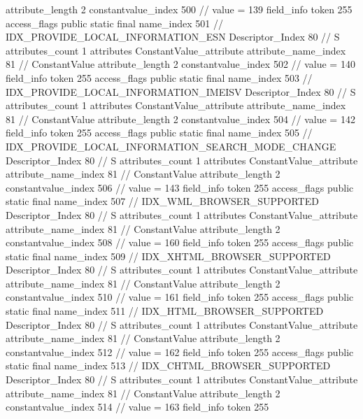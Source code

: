 {{{{{{{					attribute_length	2
					constantvalue_index	500		// value = 139
				}
				}
			}
			field_info {
				token	255
				access_flags	public static final
				name_index	501		// IDX_PROVIDE_LOCAL_INFORMATION_ESN
				Descriptor_Index	80		// S
				attributes_count	1
				attributes {
				ConstantValue_attribute {
					attribute_name_index	81		// ConstantValue
					attribute_length	2
					constantvalue_index	502		// value = 140
				}
				}
			}
			field_info {
				token	255
				access_flags	public static final
				name_index	503		// IDX_PROVIDE_LOCAL_INFORMATION_IMEISV
				Descriptor_Index	80		// S
				attributes_count	1
				attributes {
				ConstantValue_attribute {
					attribute_name_index	81		// ConstantValue
					attribute_length	2
					constantvalue_index	504		// value = 142
				}
				}
			}
			field_info {
				token	255
				access_flags	public static final
				name_index	505		// IDX_PROVIDE_LOCAL_INFORMATION_SEARCH_MODE_CHANGE
				Descriptor_Index	80		// S
				attributes_count	1
				attributes {
				ConstantValue_attribute {
					attribute_name_index	81		// ConstantValue
					attribute_length	2
					constantvalue_index	506		// value = 143
				}
				}
			}
			field_info {
				token	255
				access_flags	public static final
				name_index	507		// IDX_WML_BROWSER_SUPPORTED
				Descriptor_Index	80		// S
				attributes_count	1
				attributes {
				ConstantValue_attribute {
					attribute_name_index	81		// ConstantValue
					attribute_length	2
					constantvalue_index	508		// value = 160
				}
				}
			}
			field_info {
				token	255
				access_flags	public static final
				name_index	509		// IDX_XHTML_BROWSER_SUPPORTED
				Descriptor_Index	80		// S
				attributes_count	1
				attributes {
				ConstantValue_attribute {
					attribute_name_index	81		// ConstantValue
					attribute_length	2
					constantvalue_index	510		// value = 161
				}
				}
			}
			field_info {
				token	255
				access_flags	public static final
				name_index	511		// IDX_HTML_BROWSER_SUPPORTED
				Descriptor_Index	80		// S
				attributes_count	1
				attributes {
				ConstantValue_attribute {
					attribute_name_index	81		// ConstantValue
					attribute_length	2
					constantvalue_index	512		// value = 162
				}
				}
			}
			field_info {
				token	255
				access_flags	public static final
				name_index	513		// IDX_CHTML_BROWSER_SUPPORTED
				Descriptor_Index	80		// S
				attributes_count	1
				attributes {
				ConstantValue_attribute {
					attribute_name_index	81		// ConstantValue
					attribute_length	2
					constantvalue_index	514		// value = 163
				}
				}
			}
			field_info {
				token	255
}}}}}
